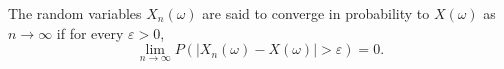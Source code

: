 The random variables $X_n(\omega)$ are said to converge in probability to $X(\omega)$ as $n \to \infty$ if for every $\varepsilon > 0$,
$$\lim_{n \to \infty} P(|X_n(\omega) - X(\omega)| > \varepsilon) = 0.$$
